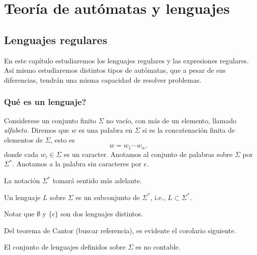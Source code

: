 \part[Aut\'omatas]{Teor\'ia de aut\'omatas y lenguajes}



\chapter{Lenguajes regulares}

En este cap\'itulo estudiaremos los lenguajes regulares y las expresiones regulares.
As\'i mismo estudiaremos distintos tipos de aut\'omatas, que a pesar de sus diferencias, tendr\'an una misma capacidad de resolver problemas.

\section{\preg Qu\'e es un lenguaje?}

Considerese un conjunto finito \( \Sigma \) no vac\'io, con m\'as de un elemento, llamado \emph{alfabeto.}
Diremos que \(w\) es una palabra en \(\Sigma\) si es la concatenaci\'on finita de elementos de \(\Sigma\), esto es \[ w = w_1\cdots w_n,\] donde cada \(w_i\in \Sigma\) es un caracter.
Anotamos al conjunto de palabras sobre \( \Sigma \) por \(\Sigma^*.\)
Anotamos a la palabra sin caracteres por \( \epsilon.\)

\begin{obs}
    La notaci\'on \(\Sigma^*\) tomar\'a sentido m\'as adelante.
\end{obs}

\begin{definicion}
    Un lenguaje \( L \) sobre \( \Sigma\) es un subconjunto de \(\Sigma^*\), i.e., \(L\subset \Sigma^*.\)
\end{definicion}

\begin{obs}
    Notar que \(\emptyset\) y \(\{\epsilon\}\) son dos lenguajes distintos.
\end{obs}

Del teorema de Cantor (buscar referencia), es evidente el corolario siguiente.

\begin{corolario}
    El conjunto de lenguajes definidos sobre \(\Sigma\) es no contable.
\end{corolario}

